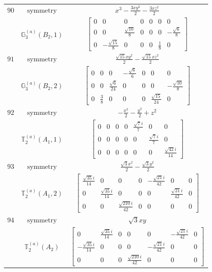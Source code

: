 \documentclass[fleqn,8pt,landscape]{jsarticle}
\begin{document}
\begin{longtable}{ccc}
$ 90 $ & $ \text{symmetry} $ & $ x^{3} - \frac{3 x y^{2}}{2} - \frac{3 x z^{2}}{2} $ \\
$  $ & $ \mathbb{G}_{3}^{(a)}(B_{2},1) $ & $ \begin{bmatrix} 0 & 0 & 0 & 0 & 0 & 0 & 0 \\ 0 & 0 & \frac{\sqrt{10}}{8} & 0 & 0 & 0 & - \frac{\sqrt{6}}{8} \\ 0 & - \frac{\sqrt{15}}{8} & 0 & 0 & 0 & \frac{1}{8} & 0 \end{bmatrix} $ \\ \hline
$ 91 $ & $ \text{symmetry} $ & $ \frac{\sqrt{15} x y^{2}}{2} - \frac{\sqrt{15} x z^{2}}{2} $ \\
$  $ & $ \mathbb{G}_{3}^{(a)}(B_{2},2) $ & $ \begin{bmatrix} 0 & 0 & 0 & - \frac{\sqrt{6}}{6} & 0 & 0 & 0 \\ 0 & 0 & \frac{\sqrt{6}}{24} & 0 & 0 & 0 & - \frac{\sqrt{10}}{8} \\ 0 & \frac{3}{8} & 0 & 0 & 0 & \frac{\sqrt{15}}{24} & 0 \end{bmatrix} $ \\ \hline
$ 92 $ & $ \text{symmetry} $ & $ - \frac{x^{2}}{2} - \frac{y^{2}}{2} + z^{2} $ \\
$  $ & $ \mathbb{T}_{2}^{(a)}(A_{1},1) $ & $ \begin{bmatrix} 0 & 0 & 0 & 0 & \frac{\sqrt{7} i}{7} & 0 & 0 \\ 0 & 0 & 0 & 0 & 0 & \frac{\sqrt{7} i}{7} & 0 \\ 0 & 0 & 0 & 0 & 0 & 0 & \frac{\sqrt{42} i}{14} \end{bmatrix} $ \\ \hline
$ 93 $ & $ \text{symmetry} $ & $ \frac{\sqrt{3} x^{2}}{2} - \frac{\sqrt{3} y^{2}}{2} $ \\
$  $ & $ \mathbb{T}_{2}^{(a)}(A_{1},2) $ & $ \begin{bmatrix} \frac{\sqrt{35} i}{14} & 0 & 0 & 0 & - \frac{\sqrt{21} i}{42} & 0 & 0 \\ 0 & \frac{\sqrt{35} i}{14} & 0 & 0 & 0 & \frac{\sqrt{21} i}{42} & 0 \\ 0 & 0 & \frac{\sqrt{210} i}{42} & 0 & 0 & 0 & 0 \end{bmatrix} $ \\ \hline
$ 94 $ & $ \text{symmetry} $ & $ \sqrt{3} x y $ \\
$  $ & $ \mathbb{T}_{2}^{(a)}(A_{2}) $ & $ \begin{bmatrix} 0 & \frac{\sqrt{35} i}{14} & 0 & 0 & 0 & - \frac{\sqrt{21} i}{42} & 0 \\ - \frac{\sqrt{35} i}{14} & 0 & 0 & 0 & - \frac{\sqrt{21} i}{42} & 0 & 0 \\ 0 & 0 & 0 & \frac{\sqrt{210} i}{42} & 0 & 0 & 0 \end{bmatrix} $ \\ \hline

\end{longtable}
\end{document}
